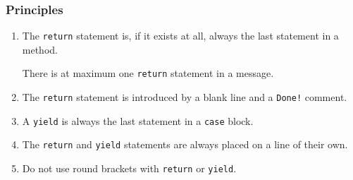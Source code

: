 \subsubsection{Principles}
\begin{enumerate}[label=P\arabic*.]
\item{The \lstinline|return| statement is, if it exists at all, always the last statement in a method.

There is at maximum one \lstinline|return| statement in a message.}
\item{The \lstinline|return| statement is introduced by a blank line and a \texttt{Done!} comment.}
\item{A \lstinline|yield| is always the last statement in a \lstinline|case| block.}
\item{The \lstinline|return| and \lstinline|yield| statements are always placed on a line of their own.}
\item{Do not use round brackets with \lstinline|return| or \lstinline|yield|.}
\end{enumerate}

